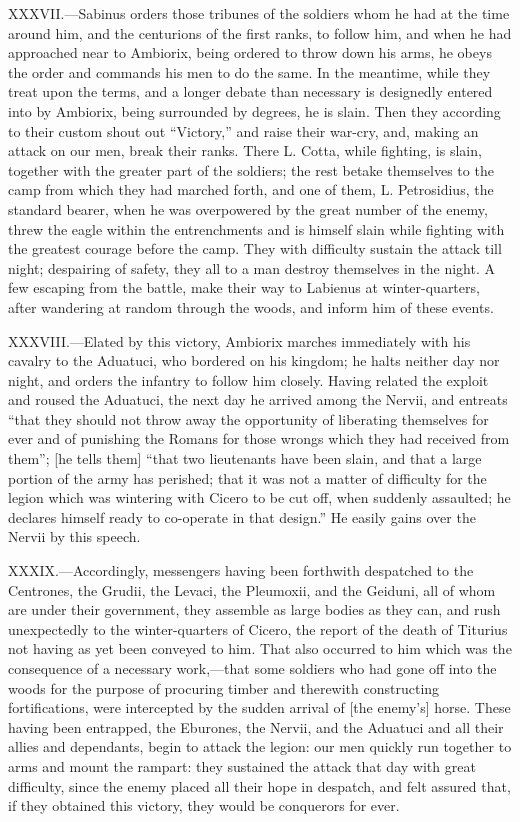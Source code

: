 XXXVII.—Sabinus orders those tribunes of the soldiers whom he had at
the time around him, and the centurions of the first ranks, to follow
him, and when he had approached near to Ambiorix, being ordered to throw
down his arms, he obeys the order and commands his men to do the same.
In the meantime, while they treat upon the terms, and a longer debate
than necessary is designedly entered into by Ambiorix, being surrounded
by degrees, he is slain. Then they according to their custom shout out
``Victory,'' and raise their war-cry, and, making an attack on our men,
break their ranks. There L. Cotta, while fighting, is slain, together
with the greater part of the soldiers; the rest betake themselves to the
camp from which they had marched forth, and one of them, L. Petrosidius,
the standard bearer, when he was overpowered by the great number of the
enemy, threw the eagle within the entrenchments and is himself slain
while fighting with the greatest courage before the camp. They with
difficulty sustain the attack till night; despairing of safety, they all
to a man destroy themselves in the night. A few escaping from the
battle, make their way to Labienus at winter-quarters, after wandering
at random through the woods, and inform him of these events.

XXXVIII.—Elated by this victory, Ambiorix marches immediately with his
cavalry to the Aduatuci, who bordered on his kingdom; he halts neither
day nor night, and orders the infantry to follow him closely. Having
related the exploit and roused the Aduatuci, the next day he arrived
among the Nervii, and entreats ``that they should not throw away the
opportunity of liberating themselves for ever and of punishing the
Romans for those wrongs which they had received from them''; [he tells
them] ``that two lieutenants have been slain, and that a large portion of
the army has perished; that it was not a matter of difficulty for the
legion which was wintering with Cicero to be cut off, when suddenly
assaulted; he declares himself ready to co-operate in that design.'' He
easily gains over the Nervii by this speech.

XXXIX.—Accordingly, messengers having been forthwith despatched to the
Centrones, the Grudii, the Levaci, the Pleumoxii, and the Geiduni, all
of whom are under their government, they assemble as large bodies as
they can, and rush unexpectedly to the winter-quarters of Cicero, the
report of the death of Titurius not having as yet been conveyed to him.
That also occurred to him which was the consequence of a necessary
work,—that some soldiers who had gone off into the woods for the
purpose of procuring timber and therewith constructing fortifications,
were intercepted by the sudden arrival of [the enemy's] horse. These
having been entrapped, the Eburones, the Nervii, and the Aduatuci and
all their allies and dependants, begin to attack the legion: our men
quickly run together to arms and mount the rampart: they sustained the
attack that day with great difficulty, since the enemy placed all their
hope in despatch, and felt assured that, if they obtained this victory,
they would be conquerors for ever.

